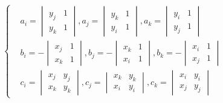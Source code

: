             \begin{align*}
            \left\{
            \begin{aligned}
                &a_i =
                    \begin{vmatrix}
                        y_j & 1\\
                        y_k & 1
                    \end{vmatrix},
                a_j =
                    \begin{vmatrix}
                        y_k & 1\\
                        y_i & 1
                    \end{vmatrix},
                a_k =
                    \begin{vmatrix}
                        y_i & 1\\
                        y_j & 1
                    \end{vmatrix} \\
                &b_i = -
                    \begin{vmatrix}
                        x_j & 1\\
                        x_k & 1
                    \end{vmatrix},
                b_j = -
                    \begin{vmatrix}
                        x_k & 1\\
                        x_i & 1
                    \end{vmatrix},
                b_k = -
                    \begin{vmatrix}
                        x_i & 1\\
                        x_j & 1
                    \end{vmatrix} \\
                &c_i =
                    \begin{vmatrix}
                        x_j & y_j\\
                        x_k & y_k
                    \end{vmatrix},
                c_j =
                    \begin{vmatrix}
                        x_k & y_k\\
                        x_i & y_i
                    \end{vmatrix},
                c_k =
                    \begin{vmatrix}
                        x_i & y_i\\
                        x_j & y_j
                    \end{vmatrix}
            \end{aligned}
            \right.
            \end{align*}
